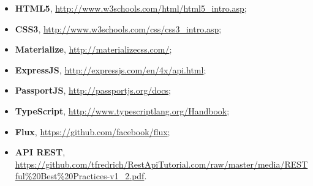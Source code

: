 \begin{itemize}
\item \textbf{HTML5}, \url{http://www.w3schools.com/html/html5\_intro.asp};
\item \textbf{CSS3}, \url{http://www.w3schools.com/css/css3\_intro.asp};
\item \textbf{Materialize}, \url{http://materializecss.com/};
\item \textbf{ExpressJS}, \url{http://expressjs.com/en/4x/api.html};
\item \textbf{PassportJS}, \url{http://passportjs.org/docs};
\item \textbf{TypeScript}, \url{http://www.typescriptlang.org/Handbook};
\item \textbf{Flux}, \url{https://github.com/facebook/flux};
\item \textbf{API REST}, \url{https://github.com/tfredrich/RestApiTutorial.com/raw/master/media/RESTful\%20Best\%20Practices-v1\_2.pdf}.
\end{itemize}
